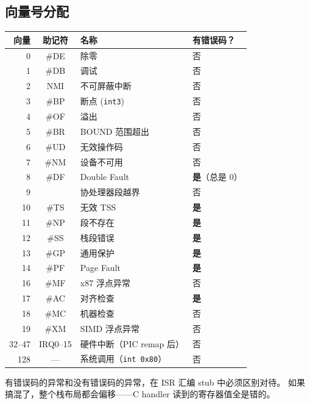 \subsection{向量号分配}

\begin{longtable}{rcll}
  \toprule
  \textbf{向量} & \textbf{助记符} & \textbf{名称} & \textbf{有错误码？} \\
  \midrule
  0  & \#DE & 除零               & 否 \\
  1  & \#DB & 调试               & 否 \\
  2  & NMI  & 不可屏蔽中断       & 否 \\
  3  & \#BP & 断点 (\texttt{int3}) & 否 \\
  4  & \#OF & 溢出               & 否 \\
  5  & \#BR & BOUND 范围超出     & 否 \\
  6  & \#UD & 无效操作码         & 否 \\
  7  & \#NM & 设备不可用         & 否 \\
  8  & \#DF & Double Fault       & \textbf{是}（总是 0） \\
  9  &      & 协处理器段越界     & 否 \\
  10 & \#TS & 无效 TSS           & \textbf{是} \\
  11 & \#NP & 段不存在           & \textbf{是} \\
  12 & \#SS & 栈段错误           & \textbf{是} \\
  13 & \#GP & 通用保护           & \textbf{是} \\
  14 & \#PF & Page Fault         & \textbf{是} \\
  16 & \#MF & x87 浮点异常       & 否 \\
  17 & \#AC & 对齐检查           & \textbf{是} \\
  18 & \#MC & 机器检查           & 否 \\
  19 & \#XM & SIMD 浮点异常      & 否 \\
  \midrule
  32--47 & IRQ0--15 & 硬件中断（PIC remap 后） & 否 \\
  128    & ---      & 系统调用（\texttt{int 0x80}） & 否 \\
  \bottomrule
\end{longtable}

\begin{warnbox}
有错误码的异常和没有错误码的异常，在 ISR 汇编 stub 中必须区别对待。
如果搞混了，整个栈布局都会偏移——C handler 读到的寄存器值全是错的。
\end{warnbox}


